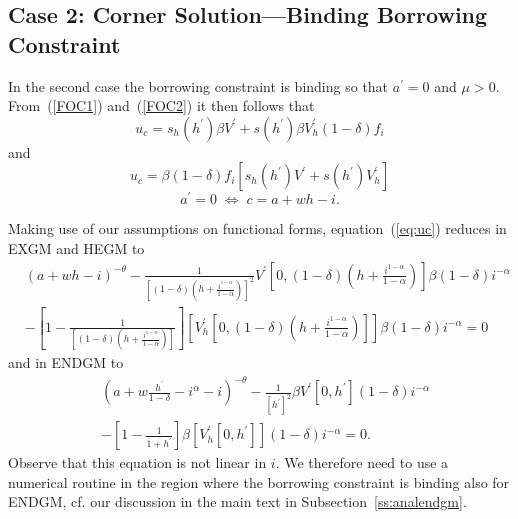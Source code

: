 \documentclass[a4paper,12pt]{article}%
\begin{document}
\subsection*{Case 2: Corner Solution---Binding Borrowing Constraint}

In the second case the borrowing constraint is binding so that $a^{\prime}=0 $
and $\mu>0$. From~(\ref{FOC1}) and~(\ref{FOC2}) it then follows that
\begin{equation}
u_{c}=s_{h}\left(  h^{\prime}\right)  \beta V^{\prime}+s\left(  h^{\prime
}\right)  \beta V_{h}^{\prime}\left(  1-\delta\right)  f_{i} \label{eq:uc}%
\end{equation}
and%
\[
u_{c}=\beta\left(  1-\delta\right)  f_{i}\left[  s_{h}\left(  h^{\prime
}\right)  V^{\prime}+s\left(  h^{\prime}\right)  V_{h}^{\prime}\right]
\]%
\[
a^{\prime}=0\;\Leftrightarrow\;c=a+wh-i.
\]


Making use of our assumptions on functional forms, equation~(\ref{eq:uc})
reduces in EXGM and HEGM to
\begin{align*}
&  \left(  a+wh-i\right)  ^{-\theta}-\frac{1}{\left[  \left(  1-\delta\right)
\left(  h+\frac{i^{1-\alpha}}{1-\alpha}\right)  \right]  ^{2}}V^{\prime
}\left[  0,\left(  1-\delta\right)  \left(  h+\frac{i^{1-\alpha}}{1-\alpha
}\right)  \right]  \beta\left(  1-\delta\right)  i^{-\alpha}\\
&  -\left[  1-\frac{1}{\left[  \left(  1-\delta\right)  \left(  h+\frac
{i^{1-\alpha}}{1-\alpha}\right)  \right]  }\right]  \left[  V_{h}^{\prime
}\left[  0,\left(  1-\delta\right)  \left(  h+\frac{i^{1-\alpha}}{1-\alpha
}\right)  \right]  \right]  \beta\left(  1-\delta\right)  i^{-\alpha}=0
\end{align*}
and in ENDGM to
\begin{align*}
&  \left(  a+w\frac{h^{\prime}}{1-\delta}-i^{\alpha}-i\right)  ^{-\theta
}-\frac{1}{\left[  h^{\prime}\right]  ^{2}}\beta V^{\prime}\left[
0,h^{\prime}\right]  \left(  1-\delta\right)  i^{-\alpha}\\
&  -\left[  1-\frac{1}{1+h^{\prime}}\right]  \beta\left[  V_{h}^{\prime
}\left[  0,h^{\prime}\right]  \right]  \left(  1-\delta\right)  i^{-\alpha}=0.
\end{align*}
Observe that this equation is not linear in $i$. We therefore need to use a
numerical routine in the region where the borrowing constraint is binding also
for ENDGM, cf. our discussion in the main text in
Subsection~\ref{ss:analendgm}.

\qquad
\end{document}
